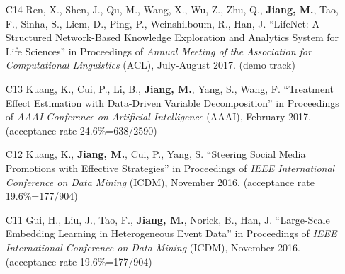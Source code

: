 \documentclass[10pt]{article}
\newenvironment{myindentpar}[1]%
{\begin{list}{}%
         {\setlength{\leftmargin}{#1}}%
         \item[]%
}
{\end{list}}
\newcounter{list}
\newcommand{\hide}[1]{}
\begin{document}
\begin{myindentpar}{0.00cm}
\begin{enumerate}[leftmargin=.5cm]
	\hide{\vspace{-0.1cm}\hspace{0.5cm}{\small \emph{Mr. Kuang conceived the idea in consultation with myself. Mr. Kuang implemented the system and completed the experiments. Mr. Kuang wrote the paper.}}}

\item[C14] Ren, X., Shen, J., Qu, M., Wang, X., Wu, Z., Zhu, Q., \textbf{Jiang, M.}, Tao, F., Sinha, S., Liem, D., Ping, P., Weinshilboum, R., Han, J. ``LifeNet: A Structured Network-Based Knowledge Exploration and Analytics System for Life Sciences'' in Proceedings of \emph{Annual Meeting of the Association for Computational Linguistics} (ACL), July-August 2017. (demo track)

	\hide{\vspace{-0.1cm}\hspace{0.5cm}{\small \emph{Mr. Ren conceived the idea. Mr. Shen implemented the system and completed the experiments. Mr. Ren wrote the paper. I edited the paper.}}}

\item[C13] Kuang, K., Cui, P., Li, B., \textbf{Jiang, M.}, Yang, S., Wang, F. ``Treatment Effect Estimation with Data-Driven Variable Decomposition'' in Proceedings of \emph{AAAI Conference on Artificial Intelligence} (AAAI), February 2017. (acceptance rate 24.6\%=638/2590)

	\hide{\vspace{-0.1cm}\hspace{0.5cm}{\small \emph{Mr. Kuang conceived the idea in consultation with myself. Mr. Kuang implemented the system and completed the experiments. Mr. Kuang wrote the paper.}}}

\item[C12] Kuang, K., \textbf{Jiang, M.}, Cui, P., Yang, S. ``Steering Social Media Promotions with Effective Strategies'' in Proceedings of \emph{IEEE International Conference on Data Mining} (ICDM), November 2016. (acceptance rate 19.6\%=177/904)

	\hide{\vspace{-0.1cm}\hspace{0.5cm}{\small \emph{I conceived the idea. Mr. Kuang implemented the system and completed the experiments. Mr. Kuang and I wrote the paper.}}}

\item[C11] Gui, H., Liu, J., Tao, F., \textbf{Jiang, M.}, Norick, B., Han, J. ``Large-Scale Embedding Learning in Heterogeneous Event Data'' in Proceedings of \emph{IEEE International Conference on Data Mining} (ICDM), November 2016. (acceptance rate 19.6\%=177/904)


\end{enumerate}
\end{myindentpar}
\end{document}
